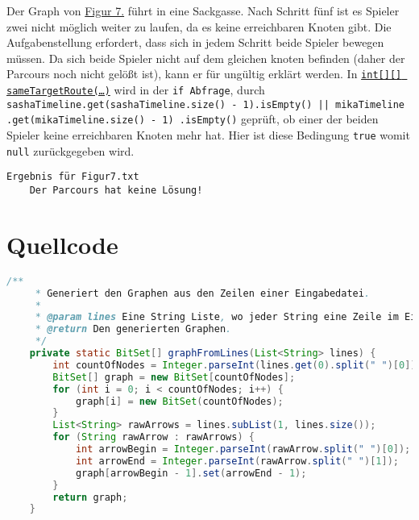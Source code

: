\documentclass[a4paper,10pt,ngerman]{scrartcl}
\begin{document}
	Der Graph von \hyperref[fig:Figure7]{Figur 7.} führt in eine Sackgasse.
	Nach Schritt fünf ist es Spieler zwei nicht möglich weiter zu laufen, da es keine erreichbaren Knoten gibt.
	Die Aufgabenstellung erfordert, dass sich in jedem Schritt beide Spieler bewegen müssen.
	Da sich beide Spieler nicht auf dem gleichen knoten befinden (daher der Parcours noch nicht gelößt ist),
	kann er für ungültig erklärt werden.
	In \hyperref[lst:sameTargetRoute]{\texttt{int[][] sameTargetRoute(\ldots)}} wird in der \texttt{if Abfrage}, durch 
	\texttt{sashaTimeline.get(sashaTimeline.size() - 1).isEmpty() || mikaTimeline
    .get(mikaTimeline.size() - 1)
    .isEmpty()} geprüft, ob einer der beiden Spieler keine erreichbaren Knoten mehr hat.
    Hier ist diese Bedingung \texttt{true} womit \texttt{null} zurückgegeben wird.
    
     \begin{lstlisting}[frame=single, title=Programmausgabe Figur 7., breaklines=true]
  Ergebnis für Figur7.txt
	Der Parcours hat keine Lösung!
    \end{lstlisting}
    
    \clearpage

    \section{Quellcode}
    \label{sec:quellcode}
    \label{LastPage}
    \begin{lstlisting}[frame=single,language=Java,title=Methode graphFromLines,breaklines=true]
    /**
     * Generiert den Graphen aus den Zeilen einer Eingabedatei.
     *
     * @param lines Eine String Liste, wo jeder String eine Zeile im Eingabeformat ist.
     * @return Den generierten Graphen.
     */
    private static BitSet[] graphFromLines(List<String> lines) {
        int countOfNodes = Integer.parseInt(lines.get(0).split(" ")[0]);
        BitSet[] graph = new BitSet[countOfNodes];
        for (int i = 0; i < countOfNodes; i++) {
            graph[i] = new BitSet(countOfNodes);
        }
        List<String> rawArrows = lines.subList(1, lines.size());
        for (String rawArrow : rawArrows) {
            int arrowBegin = Integer.parseInt(rawArrow.split(" ")[0]);
            int arrowEnd = Integer.parseInt(rawArrow.split(" ")[1]);
            graph[arrowBegin - 1].set(arrowEnd - 1);
        }
        return graph;
    }
    \end{lstlisting}
\end{document}
